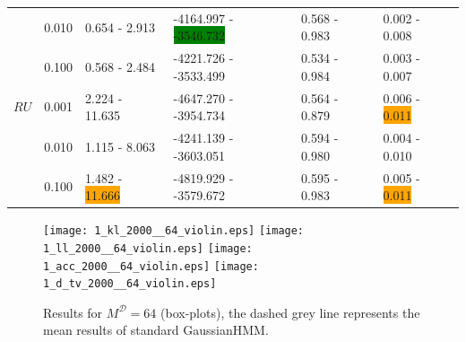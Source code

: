 \documentclass[shortabstract]{iithesis}
\begin{document}
\begin{table}[!ht]
\begin{tabular}{llllll}
        & 0.010 &   0.654 - 2.913 &  -4164.997 - \colorbox{green}{-3546.732} &  0.568 - 0.983 &  0.002 - 0.008 \\
        & 0.100 &   0.568 - 2.484 &  -4221.726 - -3533.499 &  0.534 - 0.984 &  0.003 - 0.007 \\
$RU$& 0.001 &  2.224 - 11.635 &   -4647.270 - -3954.734 &  0.564 - 0.879 &  0.006 - \colorbox{orange}{0.011} \\
        & 0.010 &   1.115 - 8.063 &  -4241.139 - -3603.051 &   0.594 - 0.980 &   0.004 - 0.010 \\
        & 0.100 &  1.482 - \colorbox{orange}{11.666} &  -4819.929 - -3579.672 &  0.595 - 0.983 &  0.005 - \colorbox{orange}{0.011} \\
\hline
\end{tabular}
\end{table}

\newpage

\begin{figure}[!ht]
    \centering
    \texttt{[image: 1\_kl\_2000\_\_64\_violin.eps]}
    \texttt{[image: 1\_ll\_2000\_\_64\_violin.eps]}
    \texttt{[image: 1\_acc\_2000\_\_64\_violin.eps]}
    \texttt{[image: 1\_d\_tv\_2000\_\_64\_violin.eps]}
    \caption{Results for $M^{\mathcal D}=64$ (box-plots), the dashed grey line represents the mean results of standard GaussianHMM.}
     \label{fig:res_ex1_64}
\end{figure}

\pagebreak





\end{document}
